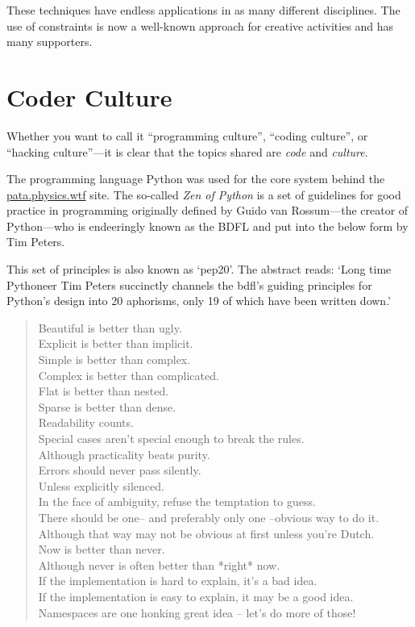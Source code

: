 These techniques have endless applications in as many different disciplines. The use of constraints is now a well-known approach for creative activities and has many supporters.


\section{Coder Culture}
\label{s:culture}

Whether you want to call it ``programming culture'', ``coding culture'', or ``hacking culture''---it is clear that the topics shared are \emph{code} and \emph{culture}.

The programming language Python was used for the core system behind the \url{pata.physics.wtf} site. The so-called \textit{Zen of Python} is a set of guidelines for good practice in programming originally defined by Guido van Rossum---the creator of Python---who is endeeringly known as the \ac{BDFL} and put into the below form by Tim Peters.

This set of principles is also known as `\acs{pep}20'. The abstract reads: `Long time Pythoneer Tim Peters succinctly channels the \acs{bdfl}\rq s guiding principles for Python\rq s design into \num{20} aphorisms, only \num{19} of which have been written down.' \citeyear{PEP20}

\begin{quotation}
  Beautiful is better than ugly.\\
  Explicit is better than implicit.\\
  Simple is better than complex.\\
  Complex is better than complicated.\\
  Flat is better than nested.\\
  Sparse is better than dense.\\
  Readability counts.\\
  Special cases aren't special enough to break the rules.\\
  Although practicality beats purity.\\
  Errors should never pass silently.\\
  Unless explicitly silenced.\\
  In the face of ambiguity, refuse the temptation to guess.\\
  There should be one-- and preferably only one --obvious way to do it.\\
  Although that way may not be obvious at first unless you're Dutch.\\
  Now is better than never.\\
  Although never is often better than *right* now.\\
  If the implementation is hard to explain, it's a bad idea.\\
  If the implementation is easy to explain, it may be a good idea.\\
  Namespaces are one honking great idea -- let's do more of those!
\end{quotation}

